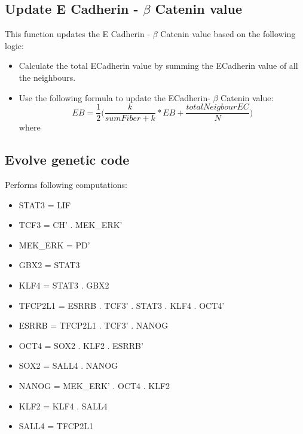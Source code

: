 \documentclass[11pt]{report}
\begin{document}
  \subsection{\color{blue}Update E Cadherin - $ \beta $ Catenin value}
  This function updates the E Cadherin - $ \beta $ Catenin value based on the following logic:
  \begin{itemize}
   \item Calculate the total ECadherin value by summing the ECadherin value of all the neighbours.
   \item Use the following formula to update the ECadherin- $\beta$ Catenin value:\\
   \begin{equation}
    EB = \frac{1}{2}\bigg(\frac{k}{sumFiber+k}*EB + \frac{totalNeigbourEC}{N}\bigg)
   \end{equation}
   where
   \end{itemize}
   \subsection{\color{blue}Evolve genetic code}
   Performs following computations: 
   \begin{itemize}
    \item STAT3 	= 	LIF
    \item TCF3 		= 	CH' . MEK{\_}ERK'
    \item MEK{\_}ERK 	= 	PD'
    \item GBX2		=	STAT3
    \item KLF4		=	STAT3 . GBX2
    \item TFCP2L1	=	ESRRB . TCF3' . STAT3 . KLF4 . OCT4'
    \item ESRRB		=	TFCP2L1 . TCF3' . NANOG
    \item OCT4		=	SOX2 . KLF2 . ESRRB'
    \item SOX2		=	SALL4 . NANOG
    \item NANOG		=	MEK{\_}ERK' . OCT4 . KLF2
    \item KLF2		=	KLF4 . SALL4
    \item SALL4		=	TFCP2L1
   \end{itemize}
\end{document}
